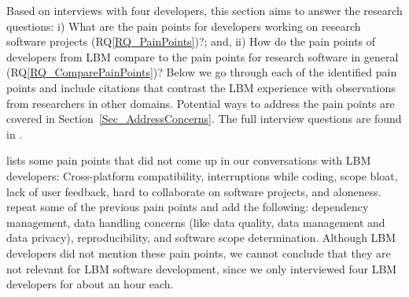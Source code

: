 \documentclass[final, 3p, times, authoryear]{elsarticle}
\newcommand{\rqref}[1]{RQ\ref{#1}}
\begin{document}
Based on interviews with four developers, this section aims to answer the
research questions: i) What are the pain points for developers working on
research software projects (\rqref{RQ_PainPoints})?; and, ii) How do the pain
points of developers from LBM compare to the pain points for research software
in general (\rqref{RQ_ComparePainPoints})?  Below we go through each of the
identified pain points and include citations that contrast the LBM experience
with observations from researchers in other domains.  Potential ways to address
the pain points are covered in Section~\ref{Sec_AddressConcerns}. The full
interview questions are found in \citet{SmithEtAl2021}.

\citet{PintoEtAl2018} lists some pain points that did not come up in our
conversations with LBM developers: Cross-platform compatibility, interruptions
while coding, scope bloat, lack of user feedback, hard to collaborate on
software projects, and aloneness. \citet{WieseEtAl2019} repeat some of the
previous pain points and add the following: dependency management, data handling
concerns (like data quality, data management and data privacy), reproducibility,
and software scope determination. Although LBM developers did not mention these
pain points, we cannot conclude that they are not relevant for LBM software
development, since we only interviewed four LBM developers for about an hour each.
\end{document}
